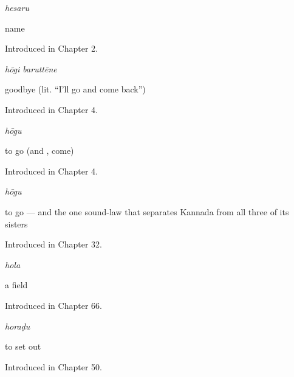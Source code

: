 \noindent\begin{minipage}[t]{\linewidth}
\raggedright
\textbf{}\enspace\emph{hesaru}\par
\small name\par
\footnotesize Introduced in Chapter 2.
\end{minipage}\par\medskip

\noindent\begin{minipage}[t]{\linewidth}
\raggedright
\textbf{ }\enspace\emph{hōgi baruttēne}\par
\small goodbye (lit. \textquotedblleft{}I'll go and come back\textquotedblright{})\par
\footnotesize Introduced in Chapter 4.
\end{minipage}\par\medskip

\noindent\begin{minipage}[t]{\linewidth}
\raggedright
\textbf{}\enspace\emph{hōgu}\par
\small to go (and , come)\par
\footnotesize Introduced in Chapter 4.
\end{minipage}\par\medskip

\noindent\begin{minipage}[t]{\linewidth}
\raggedright
\textbf{}\enspace\emph{hōgu}\par
\small to go — and the one sound-law that separates Kannada from all three of its sisters\par
\footnotesize Introduced in Chapter 32.
\end{minipage}\par\medskip

\noindent\begin{minipage}[t]{\linewidth}
\raggedright
\textbf{}\enspace\emph{hola}\par
\small a field\par
\footnotesize Introduced in Chapter 66.
\end{minipage}\par\medskip

\noindent\begin{minipage}[t]{\linewidth}
\raggedright
\textbf{}\enspace\emph{horaḍu}\par
\small to set out\par
\footnotesize Introduced in Chapter 50.
\end{minipage}\par\medskip

